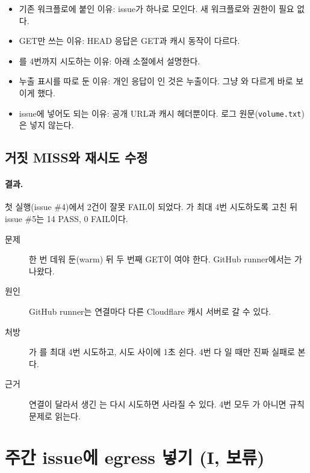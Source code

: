 \begin{itemize}[nosep]
  \item 기존 워크플로에 붙인 이유: issue가 하나로 모인다. 새 워크플로와 권한이 필요 없다.
  \item GET만 쓰는 이유: HEAD 응답은 GET과 캐시 동작이 다르다.
  \item {}를 4번까지 시도하는 이유: 아래 소절에서 설명한다.
  \item 누출 표시를 따로 둔 이유: 개인 응답이 인 것은 누출이다. 그냥 와 다르게 바로 보이게 했다.
  \item issue에 넣어도 되는 이유: 공개 URL과 캐시 헤더뿐이다. 로그 원문(\texttt{volume.txt})은 넣지 않는다.
\end{itemize}

\subsection{거짓 MISS와 재시도 수정}\label{sec:06-false-miss}

\paragraph{결과.}
첫 실행(issue \#4)에서  2건이 잘못 FAIL이 되었다.
가 최대 4번 시도하도록 고친 뒤 issue \#5는 14 PASS, 0 FAIL이다.

\begin{description}
  \item[문제] 한 번 데워 둔(warm) 뒤 두 번째 GET이 여야 한다. GitHub runner에서는 가 나왔다.
  \item[원인] GitHub runner는 연결마다 다른 Cloudflare 캐시 서버로 갈 수 있다.
  \item[처방] 가 를 최대 4번 시도하고, 시도 사이에 1초 쉰다. 4번 다 일 때만 진짜 실패로 본다.
  \item[근거] 연결이 달라서 생긴 는 다시 시도하면 사라질 수 있다. 4번 모두 가 아니면 규칙 문제로 읽는다.
\end{description}

\section{주간 issue에 egress 넣기 (I, 보류)}\label{sec:06-egress}

